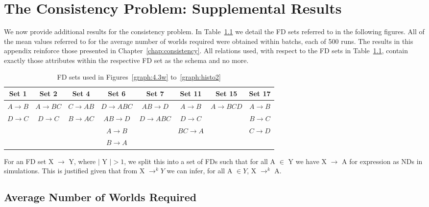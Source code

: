 \chapter{The Consistency Problem: Supplemental Results}\label{app:con_prob}

We now provide additional results for the consistency problem. In
Table~\ref{tbl:fd_set_used} we detail the FD sets referred to in the
following figures. All of the mean values referred to for the average
number of worlds required were obtained within batchs, each of 500
runs. The results in this appendix reinforce those presented in
Chapter~\ref{chap:consistency}.  All relations used, with respect to the
FD sets in Table~\ref{tbl:fd_set_used}, contain exactly those
attributes within the respective FD set as the schema and no more. 


{
\line
\begin{table}[ht]
\footnotesize{
\begin{center}
\begin{tabular}{|c||c||c||c||c||c||c||c|}
\hline
{\bf Set 1} & {\bf Set 2} 	& {\bf Set 4} 	& {\bf Set 6} & {\bf Set 7}	& { \bf Set 11} & {\bf Set 15}	& {\bf Set 17} \\ \hline \hline
$A \to B$ &	$A \to BC$	&  $C \to AB$	&  $D \to ABC$ & $AB \to D$ 	& $A \to B$ 	&$A \to BCD$	& $A \to B$ \\
$D \to C$ &	$D \to C$     &  $B \to AC$	&  $AB \to D$ & $D\to ABC$ 	& $D \to C$ &		& $B \to C$ \\
	&			&  		&  $A \to B$ & & $BC \to A$ &		& $C \to D$  \\
	&			&  		&  $B \to A$ & &  		&	&  \\\hline
\end{tabular}
\end{center}
}
\caption{\label{tbl:fd_set_used} FD sets used in
Figures~\ref{graph:4.3w} to~\ref{graph:histo2}}
\end{table}
}

For an FD set X $\to$ Y, where $\mid$ Y $\mid > 1$, we split this into
a set of FDs such that for all A $\in$ Y we have X $\to$ A for
expression as NDs in simulations.  This is justified given that from X
$\to^k Y$ we can infer, for all A $\in Y$, X $\to^k$ A.

\section{Average Number of Worlds Required}


